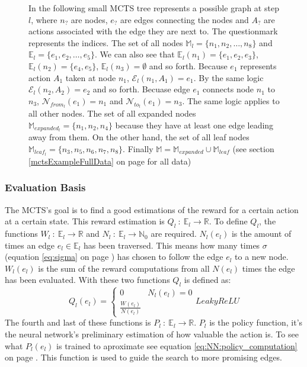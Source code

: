 \documentclass[12pt]{article}
\newcommand{\equationref}[1]{equation \ref{#1} on page \pageref{#1}}
\newcommand{\sectionref}[1]{section \ref{#1} on page \pageref{#1}}
\begin{document}
\begin{figure}[H]
  \centering
  
  \captionsetup{width=.9\linewidth}
  \caption{In the following small MCTS tree represents a possible graph at step \(l\), where \(n_?\) are nodes, \(e_?\) are edges connecting the nodes and \(A_?\) are actions associated with the edge they are next to. The questionmark represents the indices. The set of all nodes \(\mathbb M_l = \{n_1, n_2, \dots, n_8\}\) and \(\mathbb E_l = \{e_1, e_2, \dots, e_5\}\). We can also see that \(\mathbb E_l(n_1) = \{e_1, e_2, e_3\}\), \(\mathbb E_l(n_2) = \{e_4, e_5\}\), \(\mathbb E_l(n_3) = \emptyset\) and so forth. Because \(e_1\) represents action \(A_1\) taken at node \(n_1\), \(\mathcal E_l(n_1, A_1) = e_1\). By the same logic \(\mathcal E_l(n_2, A_2) = e_2\) and so forth. Becuase edge \(e_1\) connects node \(n_1\) to \(n_3\), \(\mathcal N_{from_l}(e_1) = n_1\) and \(\mathcal N_{to_l}(e_1) = n_3\). The same logic applies to all other nodes. The set of all expanded nodes \(\mathbb M_{expanded_l} = \{n_1, n_2, n_4\}\) because they have at least one edge leading away from them. On the other hand, the set of all leaf nodes \(\mathbb M_{leaf_l}  = \{n_3, n_5, n_6, n_7, n_8\}\). Finally \(\mathbb M = \mathbb M_{expanded} \cup \mathbb M_{leaf}\)
(see \sectionref{mctsExampleFullData} for all data)}
	\label{fig:mcts:example}
\end{figure}

\subsubsection{Evaluation Basis}
The MCTS's goal is to find a good estimations of the reward for a certain action at a certain state. This reward estimation is \(Q_l~:~\mathbb{E}_{l}\to \mathbb{R}\). To define \(Q_l\), the functions \(W_l~:~\mathbb{E}_{l}\to\mathbb{R}\) and \(N_l~:~\mathbb{E}_{l}\to\mathbb{N}_0\) are required. \(N_l(e_l)\) is the amount of times an edge \(e_l\in\mathbb{E}_{l}\) has been traversed. This means how many times \(\sigma\) (\equationref{eq:sigma}) has chosen to follow the edge \(e_l\) to a new node. \(W_l(e_l)\) is the sum of the reward computations from all \(N(e_l)\) times the edge has been evaluated. With these two functions \(Q_l\) is defined as:
\begin{equation}\label{eq:Ql}
Q_l(e_l) = 
\begin{cases}
0 & N_l(e_l) = 0\\
\frac{W(e_l)}{N(e_l)} &
\end{cases}LeakyReLU
\end{equation}
The fourth and last of these functions is \(P_l~:~\mathbb{E}_{l}\to\mathbb{R}\). \(P_l\) is the policy function, it's the neural network's preliminary estimation of how valuable the action is. To see what \(P_l(e_l)\) is trained to aproximate see \equationref{eq:NN:policy_computation}.
This function is used to guide the search to more promising edges.
\end{document}
